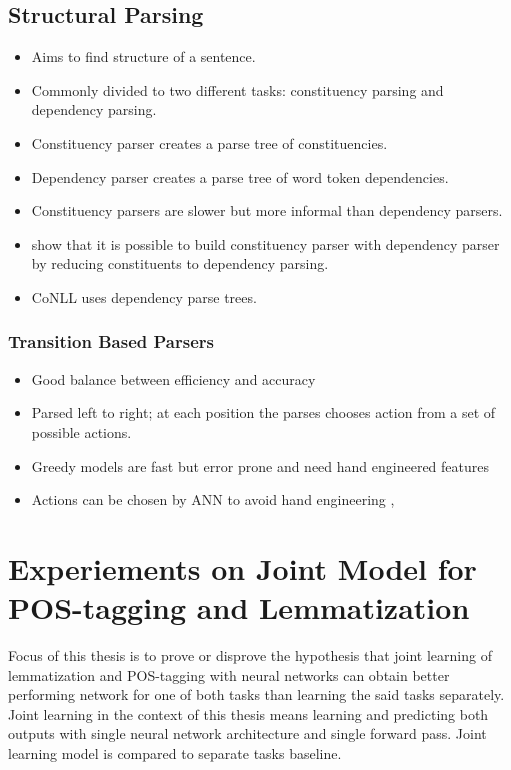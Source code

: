 \documentclass[12pt,a4paper,english
]{tutthesis}
\begin{document}
\section{Structural Parsing}
\label{se:structural_parsing}
\begin{itemize}
\item Aims to find structure of a sentence.
\item Commonly divided to two different tasks: constituency parsing and dependency parsing.
\item Constituency parser creates a parse tree of constituencies.
\item Dependency parser creates a parse tree of word token dependencies.
\item Constituency parsers are slower but more informal than dependency parsers. \cite{Fernandez-Gonzalez2015}
\item \cite{Fernandez-Gonzalez2015} show that it is possible to build constituency parser with dependency parser by reducing constituents to dependency parsing.
\item CoNLL uses dependency parse trees.
\end{itemize}

\subsection{Transition Based Parsers}
\begin{itemize}
\item Good balance between efficiency and accuracy \cite{Weiss2015}
\item Parsed left to right; at each position the parses chooses action from a set of possible actions.
\item Greedy models are fast but error prone and need hand engineered features \cite{Weiss2015}
\item Actions can be chosen by ANN to avoid hand engineering \cite{Chen2014}, \cite{Weiss2015}
\end{itemize}


\chapter{Experiements on Joint Model for POS-tagging and Lemmatization}
\label{ch:experiements_on_joint_model_for_pos_tagging_and_lemmatization}
Focus of this thesis is to prove or disprove the hypothesis that joint learning of lemmatization and POS-tagging with neural networks can obtain better performing network for one of both tasks than learning the said tasks separately. Joint learning in the context of this thesis means learning and predicting both outputs with single neural network architecture and single forward pass. Joint learning model is compared to separate tasks baseline.
\end{document}
